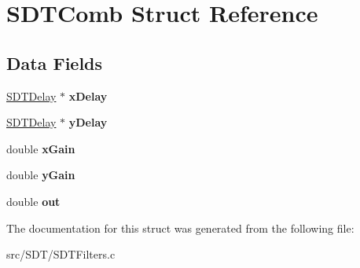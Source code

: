 \hypertarget{struct_s_d_t_comb}{}\section{S\+D\+T\+Comb Struct Reference}
\label{struct_s_d_t_comb}
\subsection*{Data Fields}
\begin{DoxyCompactItemize}
\item 
\hypertarget{struct_s_d_t_comb_a16eb1d0bcdc25e99fd827af729a24f96}{}\hyperlink{struct_s_d_t_delay}{S\+D\+T\+Delay} $\ast$ {\bfseries x\+Delay}\label{struct_s_d_t_comb_a16eb1d0bcdc25e99fd827af729a24f96}

\item 
\hypertarget{struct_s_d_t_comb_a244b5b44ec82140998ecec750b28b62f}{}\hyperlink{struct_s_d_t_delay}{S\+D\+T\+Delay} $\ast$ {\bfseries y\+Delay}\label{struct_s_d_t_comb_a244b5b44ec82140998ecec750b28b62f}

\item 
\hypertarget{struct_s_d_t_comb_a72d80d0ad16e7cb98e924229f19e7c8e}{}double {\bfseries x\+Gain}\label{struct_s_d_t_comb_a72d80d0ad16e7cb98e924229f19e7c8e}

\item 
\hypertarget{struct_s_d_t_comb_aec3c9a416b8436a32895762817210ece}{}double {\bfseries y\+Gain}\label{struct_s_d_t_comb_aec3c9a416b8436a32895762817210ece}

\item 
\hypertarget{struct_s_d_t_comb_af6f4cafc00cee94f00e07fce79a1e1d9}{}double {\bfseries out}\label{struct_s_d_t_comb_af6f4cafc00cee94f00e07fce79a1e1d9}

\end{DoxyCompactItemize}


The documentation for this struct was generated from the following file\+:\begin{DoxyCompactItemize}
\item 
src/\+S\+D\+T/S\+D\+T\+Filters.\+c\end{DoxyCompactItemize}

